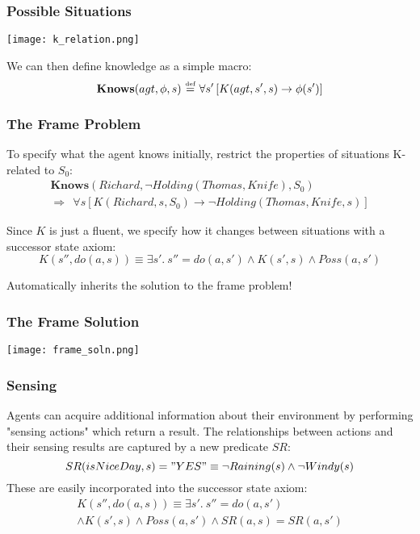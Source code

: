 \documentclass{beamer}
\newcommand{\isdef}{\hbox{$\stackrel{\mbox{\tiny def}}{=}$}}
\begin{document}
\begin{frame}
\frametitle{Possible Situations}
\begin{center}
  \texttt{[image: k\_relation.png]}
\end{center}

We can then define knowledge as a simple macro:
\[ \mathbf{Knows}(agt,\phi,s)\ \isdef\ \forall s'\left[K(agt,s',s)\rightarrow \phi(s')\right] \]
\end{frame}

\begin{frame}
\frametitle{The Frame Problem}
To specify what the agent knows initially, restrict the properties of situations
K-related to $S_0$:
\begin{gather*}
  \mathbf{Knows}(Richard,\neg Holding(Thomas,Knife),S_0) \\
  \Rightarrow \ \ \forall s \left[K(Richard,s,S_0) \rightarrow \neg Holding(Thomas,Knife,s) \right]
\end{gather*}

\pause
Since $K$ is just a fluent, we specify how it changes  between situations
with a successor state axiom:
\begin{equation*}
 K(s'',do(a,s)) \equiv \exists s' . \ s''=do(a,s')
 \wedge K(s',s) \wedge Poss(a,s')
\end{equation*}

Automatically inherits the solution to the frame problem!
\end{frame}

\begin{frame}
\frametitle{The Frame Solution}
\begin{center}
  \texttt{[image: frame\_soln.png]}
\end{center}
\end{frame}

\begin{frame}
\frametitle{Sensing}
Agents can acquire additional information about their environment by performing
"sensing actions" which return a result.  The relationships between actions
and their sensing results are captured by a new predicate $SR$:
\begin{equation*}
SR(isNiceDay,s) = "YES" \equiv \neg Raining(s) \wedge \neg Windy(s)
\end{equation*}
These are easily incorporated into the successor state axiom:
\begin{multline*}
 K(s'',do(a,s)) \equiv \exists s' . \ s''=do(a,s') \\
 \wedge K(s',s) \wedge Poss(a,s') \wedge SR(a,s) = SR(a,s')
\end{multline*}
\end{frame}
\end{document}
